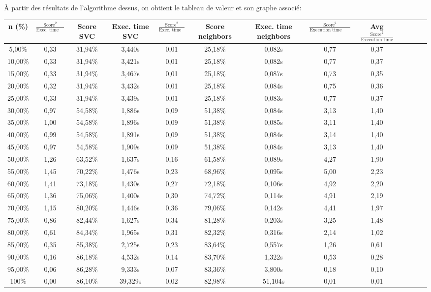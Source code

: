 \documentclass[12pt,a4paper]{article}
\begin{document}
{À partir des résultats de l'algorithme dessus, on obtient le tableau de valeur et son graphe associé:
{\sffamily\scriptsize\centering
\begin{tabular}{|*{13}{c|}}
    \hline
    \tiny n (\%) & \tiny $\frac{\text{Score}^{2}}{\text{Exec. time DMIN}}$ & \tiny Score SVC & \tiny Exec. time SVC & \tiny $\frac{\text{Score}^{2}}{\text{Exec. time SVC}}$ & \tiny Score neighbors & \tiny Exec. time neighbors & \tiny $\frac{\text{Score}^{2}}{\text{Execution time neighbors}}$ & \tiny Avg $\frac{\text{Score}^{2}}{\text{Execution time}}$ \\
    \hline
    5,00\%  & 0,33 & 31,94\% & 3,440s  & 0,01 & 25,18\% & 0,082s  & 0,77 & 0,37 \\
    10,00\% & 0,33 & 31,94\% & 3,421s  & 0,01 & 25,18\% & 0,082s  & 0,77 & 0,37 \\
    15,00\% & 0,33 & 31,94\% & 3,467s  & 0,01 & 25,18\% & 0,087s  & 0,73 & 0,35 \\
    20,00\% & 0,32 & 31,94\% & 3,432s  & 0,01 & 25,18\% & 0,084s  & 0,75 & 0,36 \\
    25,00\% & 0,33 & 31,94\% & 3,439s  & 0,01 & 25,18\% & 0,083s  & 0,77 & 0,37 \\
    30,00\% & 0,97 & 54,58\% & 1,886s  & 0,09 & 51,38\% & 0,084s  & 3,13 & 1,40 \\
    35,00\% & 1,00 & 54,58\% & 1,896s  & 0,09 & 51,38\% & 0,085s  & 3,11 & 1,40 \\
    40,00\% & 0,99 & 54,58\% & 1,891s  & 0,09 & 51,38\% & 0,084s  & 3,14 & 1,40 \\
    45,00\% & 0,97 & 54,58\% & 1,909s  & 0,09 & 51,38\% & 0,084s  & 3,13 & 1,40 \\
    50,00\% & 1,26 & 63,52\% & 1,637s  & 0,16 & 61,58\% & 0,089s  & 4,27 & 1,90 \\
    55,00\% & 1,45 & 70,22\% & 1,476s  & 0,23 & 68,96\% & 0,095s  & 5,00 & 2,23 \\
    60,00\% & 1,41 & 73,18\% & 1,430s  & 0,27 & 72,18\% & 0,106s  & 4,92 & 2,20 \\
    65,00\% & 1,36 & 75,06\% & 1,400s  & 0,30 & 74,72\% & 0,114s  & 4,91 & 2,19 \\
    70,00\% & 1,15 & 80,20\% & 1,446s  & 0,36 & 79,06\% & 0,142s  & 4,41 & 1,97 \\
    75,00\% & 0,86 & 82,44\% & 1,627s  & 0,34 & 81,28\% & 0,203s  & 3,25 & 1,48 \\
    80,00\% & 0,61 & 84,34\% & 1,965s  & 0,31 & 82,32\% & 0,316s  & 2,14 & 1,02 \\
    85,00\% & 0,35 & 85,38\% & 2,725s  & 0,23 & 83,64\% & 0,557s  & 1,26 & 0,61 \\
    90,00\% & 0,16 & 86,18\% & 4,532s  & 0,14 & 83,70\% & 1,322s  & 0,53 & 0,28 \\
    95,00\% & 0,06 & 86,28\% & 9,333s  & 0,07 & 83,36\% & 3,800s  & 0,18 & 0,10 \\
    100\%   & 0,00 & 86,10\% & 39,329s & 0,02 & 82,98\% & 51,104s & 0,01 & 0,01 \\
    \hline
\end{tabular}}

}
\end{document}
